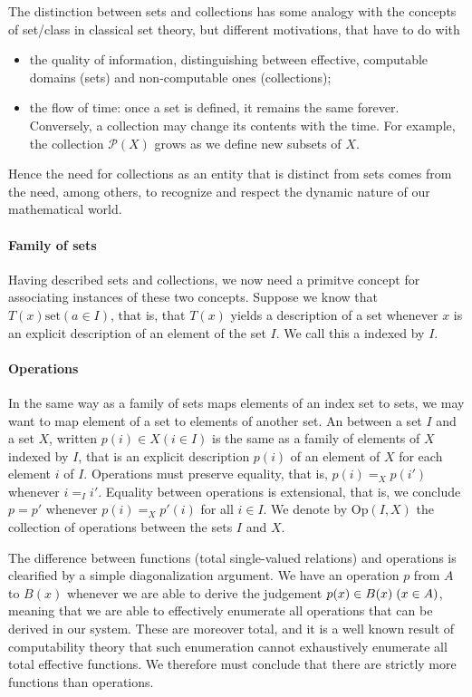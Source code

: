 The distinction between sets and collections has some analogy with the concepts
of set/class in classical set theory, but different motivations, that have to do
with

\begin{itemize}
\item the quality of information, distinguishing between effective, computable
  domains (sets) and non-computable ones (collections);
\item the flow of time: once a set is defined, it remains the same
  forever. Conversely, a collection may change its contents with the time. For
  example, the collection $\mathcal{P}(X)$ grows as we define new subsets of
  $X$.
\end{itemize}

Hence the need for collections as an entity that is distinct from sets comes
from the need, among others, to recognize and respect the dynamic nature of our
mathematical world.

\paragraph{Family of sets}

Having described sets and collections, we now need a primitve concept for
associating instances of these two concepts. Suppose we know that $T(x)
\text{set} (a \in I)$, that is, that $T(x)$ yields a description of a set
whenever $x$ is an explicit description of an element of the set $I$. We call
this a  indexed by $I$.

\paragraph{Operations}

In the same way as a family of sets maps elements of an index set to sets, we
may want to map element of a set to elements of another set. An
 between a set $I$ and a set $X$, written
$p(i) \in X (i \in I)$ is the same as a family of elements of $X$ indexed by
$I$, that is an explicit description $p(i)$ of an element of $X$ for each
element $i$ of $I$. Operations must preserve equality, that is, $p(i) =_X p(i')$
whenever $i =_I i'$.
Equality between operations is extensional, that is, we conclude $p = p'$
whenever $p(i) =_X p'(i)$ for all $i \in I$.
We denote by $\mathrm{Op}(I,X)$ the collection of operations between the sets
$I$ and $X$.

The difference between functions (total single-valued relations) and operations
is clearified by a simple diagonalization argument. We have an operation $p$
from $A$ to $B(x)$ whenever we are able to derive the judgement
$p(x) \in B(x) \; (x \in A)$, meaning that we are able to effectively enumerate
all operations that can be derived in our system. These are moreover total, and
it is a well known result of computability theory that such enumeration cannot
exhaustively enumerate all total effective functions. We therefore must conclude
that there are strictly more functions than operations.

